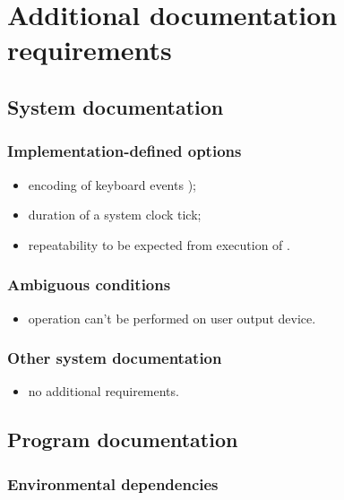 \section{Additional documentation requirements} %

\subsection{System documentation} %

\subsubsection{Implementation-defined options} %

\begin{itemize}
\item encoding of keyboard events );
\item duration of a system clock tick;
\item repeatability to be expected from execution of
	.
\end{itemize}

\subsubsection{Ambiguous conditions} %

\begin{itemize}
\item {} operation can't be performed on
	user output device.
\end{itemize}

\subsubsection{Other system documentation} %

\begin{itemize}
\item no additional requirements.
\end{itemize}

\subsection{Program documentation} %

\subsubsection{Environmental dependencies} %


